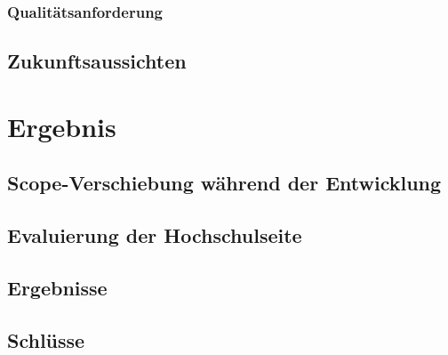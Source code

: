 		\subsection{Qualitätsanforderung}
	\section{Zukunftsaussichten}
	
\chapter{Ergebnis}
	\section{Scope-Verschiebung während der Entwicklung}
	\section{Evaluierung der Hochschulseite}
	\section{Ergebnisse}
	\section{Schlüsse}
